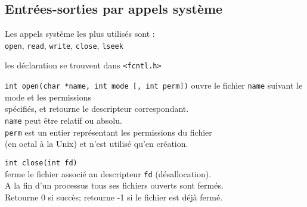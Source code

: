 \begin{frame}
    \section{Entr\'ees-sorties par appels syst\`eme}
 Les appels syst\`eme les plus utilis\'es sont :\\
\hspace*{10mm} {\tt open}, {\tt read}, {\tt write}, {\tt close}, {\tt lseek}
\par\medskip
les d\'eclaration se trouvent dans \verb?<fcntl.h>?


{\tt int open(char *name, int mode [, int perm])}
ouvre le fichier {\tt name} suivant le mode et les permissions \\
sp\'ecifi\'es, et retourne le descripteur correspondant. \\
{\tt name} peut \^etre relatif ou absolu. \\
{\tt perm} est un entier repr\'esentant les permissions du fichier \\
(en octal \`a la Unix) et n'est utilis\'e qu'en cr\'eation.
\par\bigskip
{\tt int close(int fd)} \\
ferme le fichier associ\'e au descripteur {\tt fd} (d\'esallocation). \\
A la fin d'un processus tous ses fichiers ouverts sont ferm\'es. \\
Retourne 0 si succ\`es; retourne -1 si le fichier est d\'ej\`a ferm\'e. \\



\end{frame}

